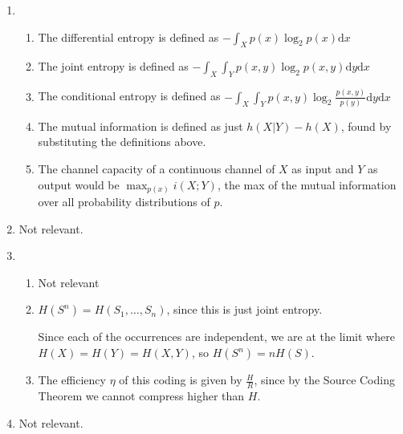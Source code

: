 


\begin{enumerate}[label=(\alph*)]

  \item
    \begin{enumerate}[label=(\roman*)]

      \item
        The differential entropy is defined as $-\int_{X} p(x) \log_2 p(x) \mathrm{d} x$

      \item
        The joint entropy is defined as $-\int_{X} \int_{Y} p(x,y) \log_2 p(x,y) \mathrm{d} y \mathrm{d} x$

      \item


        The conditional entropy is defined as $-\int_{X} \int_{Y} p(x,y) \log_2 \frac{p(x,y)}{p(y)} \mathrm{d}y \mathrm{d}x$

      \item
        The mutual information is defined as just $h(X|Y) - h(X)$, found by substituting the definitions above.

      \item
        The channel capacity of a continuous channel of $X$ as input and $Y$ as output would be $\max_{p(x)} i(X;Y)$, the max of the mutual information over all probability distributions of $p$.
        
    \end{enumerate}

  \item
    Not relevant.

  \item
    \begin{enumerate}[label=(\roman*)]

      \item
        Not relevant

      \item
        $H(S^n) = H(S_1, \ldots, S_n)$, since this is just joint entropy.

        Since each of the occurrences are independent, we are at the limit where $H(X) = H(Y) = H(X,Y)$, so $H(S^n) = nH(S)$.

      \item
        The efficiency $\eta$ of this coding is given by $\frac{H}{R}$, since by the Source Coding Theorem we cannot compress higher than $H$.


        
    \end{enumerate}

  \item
    Not relevant.
        
    \end{enumerate}

